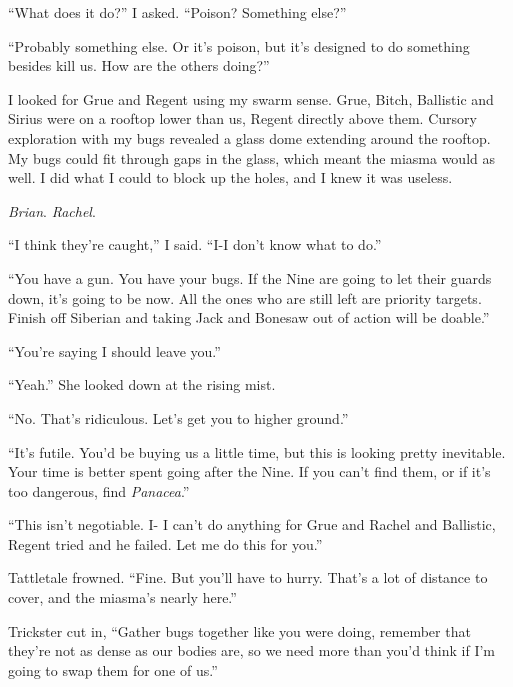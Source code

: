 ``What does it do?''  I asked.  ``Poison?  Something else?''



``Probably something else.  Or it's poison, but it's designed to do something besides kill us.  How are the others doing?''



I looked for Grue and Regent using my swarm sense.  Grue, Bitch, Ballistic and Sirius were on a rooftop lower than us, Regent directly above them.  Cursory exploration with my bugs revealed a glass dome extending around the rooftop.  My bugs could fit through gaps in the glass, which meant the miasma would as well.  I did what I could to block up the holes, and I knew it was useless.



\emph{Brian}.  \emph{Rachel}.



``I think they're caught,'' I said.  ``I-I don't know what to do.''



``You have a gun.  You have your bugs.  If the Nine are going to let their guards down, it's going to be now.  All the ones who are still left are priority targets.  Finish off Siberian and taking Jack and Bonesaw out of action will be doable.''



``You're saying I should leave you.''



``Yeah.''  She looked down at the rising mist.



``No.  That's ridiculous.  Let's get you to higher ground.''



``It's futile.  You'd be buying us a little time, but this is looking pretty inevitable.  Your time is better spent going after the Nine.  If you can't find them, or if it's too dangerous, find \emph{Panacea}.''



``This isn't negotiable.  I- I can't do anything for Grue and Rachel and Ballistic, Regent tried and he failed.  Let me do this for you.''



Tattletale frowned.  ``Fine.  But you'll have to hurry.  That's a lot of distance to cover, and the miasma's nearly here.''



Trickster cut in, ``Gather bugs together like you were doing, remember that they're not as dense as our bodies are, so we need more than you'd think if I'm going to swap them for one of us.''



